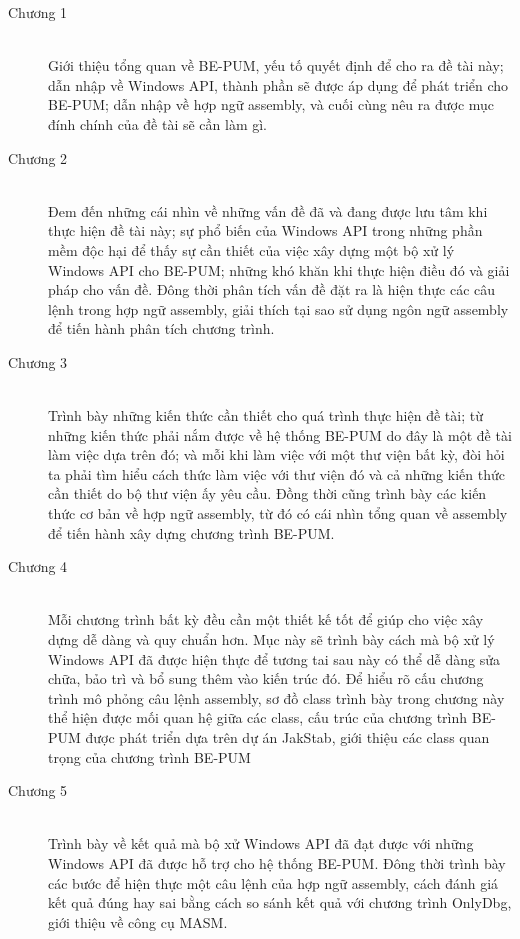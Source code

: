 \begin{description}
  	\item[Chương 1] \hfill \\
	Giới thiệu tổng quan về BE-PUM, yếu tố quyết  định để cho ra đề tài này; dẫn nhập về Windows API, thành phần sẽ được áp dụng để phát triển cho BE-PUM; dẫn nhập về hợp ngữ assembly, và cuối cùng nêu ra được mục đính chính của đề tài sẽ cần làm gì. \\
 	\item[Chương 2] \hfill \\
	Đem đến những cái nhìn về những vấn đề đã và đang được lưu tâm khi thực hiện đề tài này; sự phổ biến của Windows API trong những phần mềm độc hại để thấy sự cần thiết của việc xây dựng một bộ xử lý Windows API cho BE-PUM; những khó khăn khi thực hiện điều đó và giải pháp cho vấn đề. Đông thời phân tích vấn đề đặt ra là hiện thực các câu lệnh trong hợp ngữ assembly, giải thích tại sao sử dụng ngôn ngữ assembly để tiến hành phân tích chương trình.\\
	\item[Chương 3] \hfill \\
	Trình bày những kiến thức cần thiết cho quá trình thực hiện đề tài; từ những kiến thức phải nắm được về hệ thống BE-PUM do đây là một đề tài làm việc dựa trên đó; và mỗi khi làm việc với một thư viện bất kỳ, đòi hỏi ta phải tìm hiểu cách thức làm việc với thư viện đó và cả những kiến thức cần thiết do bộ thư viện ấy yêu cầu. Đồng thời cũng trình bày các kiến thức cơ bản về hợp ngữ assembly, từ đó có cái nhìn tổng quan về assembly để tiến hành xây dựng chương trình BE-PUM. \\
	\item[Chương 4] \hfill \\
	Mỗi chương trình bất kỳ đều cần một thiết kế tốt để giúp cho việc xây dựng dễ dàng và quy chuẩn hơn. Mục này sẽ trình bày cách mà bộ xử lý Windows API đã được hiện thực để tương tai sau này có thể dễ dàng sửa chữa, bảo trì và bổ sung thêm vào kiến trúc đó. Để hiểu rõ cấu chương trình mô phỏng câu lệnh assembly, sơ đồ class trình bày trong chương này thể hiện được mối quan hệ giữa các class, cấu trúc của chương trình BE-PUM được phát triển dựa trên dự án JakStab, giới thiệu các class quan trọng của chương trình BE-PUM\\
	\item[Chương 5] \hfill \\
	 Trình bày về kết quả mà bộ xử Windows API đã đạt được với những Windows API đã được hỗ trợ cho hệ thống BE-PUM. Đông thời trình bày các bước để hiện thực một câu lệnh của hợp ngữ assembly, cách đánh giá kết quả đúng hay sai bằng cách so sánh kết quả với chương trình OnlyDbg, giới thiệu về công cụ MASM. \\

\end{description}
